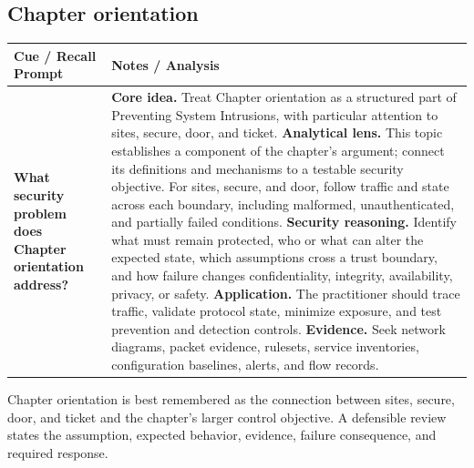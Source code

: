 \documentclass[11pt]{article}
\newcommand{\CornellHeader}{%
\rowcolor{Navy}\color{white}\bfseries Cue / Recall Prompt & \color{white}\bfseries Notes / Analysis\\\hline}
\newcommand{\CornellRow}[2]{%
\cellcolor{CueGray}\RaggedRight\textbf{#1} & \RaggedRight #2\\\hline}
\begin{document}
\subsection*{Chapter orientation}
\begin{longtable}{>{\RaggedRight\arraybackslash}p{}|>{\RaggedRight\arraybackslash}p{}}
\CornellHeader
\CornellRow{What security problem does Chapter orientation address?}{\textbf{Core idea.} Treat Chapter orientation as a structured part of Preventing System Intrusions, with particular attention to sites, secure, door, and ticket. \textbf{Analytical lens.} This topic establishes a component of the chapter's argument; connect its definitions and mechanisms to a testable security objective. For sites, secure, and door, follow traffic and state across each boundary, including malformed, unauthenticated, and partially failed conditions. \textbf{Security reasoning.} Identify what must remain protected, who or what can alter the expected state, which assumptions cross a trust boundary, and how failure changes confidentiality, integrity, availability, privacy, or safety. \textbf{Application.} The practitioner should trace traffic, validate protocol state, minimize exposure, and test prevention and detection controls. \textbf{Evidence.} Seek network diagrams, packet evidence, rulesets, service inventories, configuration baselines, alerts, and flow records.}
\end{longtable}
\begin{topicsummary}
Chapter orientation is best remembered as the connection between sites, secure, door, and ticket and the chapter's larger control objective. A defensible review states the assumption, expected behavior, evidence, failure consequence, and required response.
\end{topicsummary}
\end{document}
